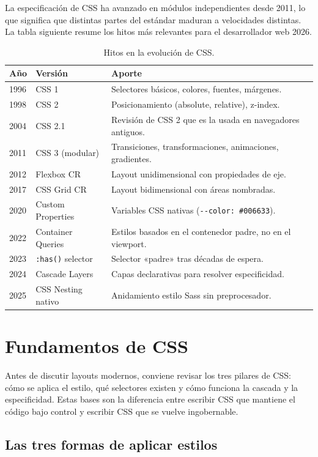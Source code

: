 \documentclass[11pt,a4paper,openany]{book}
\begin{document}
La especificación de CSS ha avanzado en módulos
independientes desde 2011, lo que significa que distintas partes del
estándar maduran a velocidades distintas. La tabla siguiente resume
los hitos más relevantes para el desarrollador web 2026.


\begin{table}[htbp]
\centering
\caption{Hitos en la evolución de CSS.}
\footnotesize
\begin{tabularx}{\textwidth}{llX}
\toprule
\textbf{Año} & \textbf{Versión} & \textbf{Aporte}\\
\midrule
1996 & CSS 1     & Selectores básicos, colores, fuentes, márgenes.\\
1998 & CSS 2     & Posicionamiento (absolute, relative), z-index.\\
2004 & CSS 2.1   & Revisión de CSS 2 que es la usada en navegadores antiguos.\\
2011 & CSS 3 (modular) & Transiciones, transformaciones, animaciones, gradientes.\\
2012 & Flexbox CR  & Layout unidimensional con propiedades de eje.\\
2017 & CSS Grid CR & Layout bidimensional con áreas nombradas.\\
2020 & Custom Properties & Variables CSS nativas (\texttt{-{}-color: \#006633}).\\
2022 & Container Queries & Estilos basados en el contenedor padre, no en el viewport.\\
2023 & \texttt{:has()} selector & Selector «padre» tras décadas de espera.\\
2024 & Cascade Layers & Capas declarativas para resolver especificidad.\\
2025 & CSS Nesting nativo & Anidamiento estilo Sass sin preprocesador.\\
\bottomrule
\end{tabularx}
\end{table}

\section{Fundamentos de CSS}

Antes de discutir layouts modernos, conviene revisar los tres
pilares de CSS: cómo se aplica el estilo, qué selectores existen y
cómo funciona la cascada y la especificidad. Estas bases son la
diferencia entre escribir CSS que mantiene el código bajo control y
escribir CSS que se vuelve ingobernable.


\subsection{Las tres formas de aplicar estilos}
\end{document}
